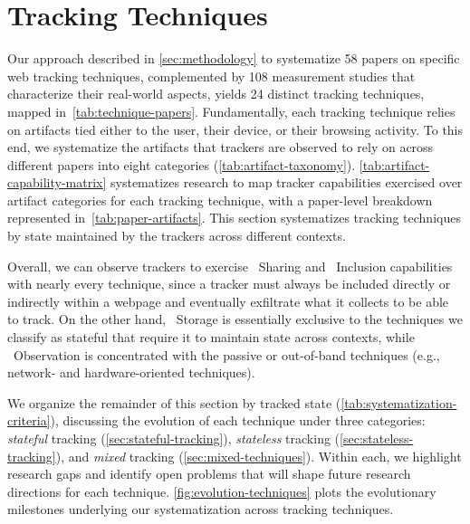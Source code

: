 \section{Tracking Techniques}
\label{sec:tracking-techniques}



Our approach described in \autoref{sec:methodology} to systematize 58 papers on specific web tracking techniques, complemented by 108 measurement studies that characterize their real-world aspects, yields 24 distinct tracking techniques, mapped in~\autoref{tab:technique-papers}.
%
Fundamentally, each tracking technique relies on artifacts tied either to the user, their device, or their browsing activity.
%
To this end, we systematize the artifacts that trackers are observed to rely on across different papers into eight categories (\autoref{tab:artifact-taxonomy}).
%
\autoref{tab:artifact-capability-matrix} systematizes research to map tracker capabilities exercised over artifact categories for each tracking technique, with a paper-level breakdown represented in~\autoref{tab:paper-artifacts}. 
%
This section systematizes tracking techniques by state maintained by the trackers across different contexts.

Overall, we can observe trackers to exercise \symSharing~Sharing and \symInclusion~Inclusion capabilities with nearly every technique, since a tracker must always be included directly or indirectly within a webpage and eventually exfiltrate what it collects to be able to track. 
%
On the other hand, \symStorage~Storage is essentially exclusive to the techniques we classify as stateful that require it to maintain state across contexts, while \symObservation~Observation is concentrated with the passive or out-of-band techniques (e.g., network- and hardware-oriented techniques).





We organize the remainder of this section by tracked state (\autoref{tab:systematization-criteria}), discussing the evolution of each technique under three categories: \textit{stateful} tracking (\autoref{sec:stateful-tracking}), \textit{stateless} tracking (\autoref{sec:stateless-tracking}), and \textit{mixed} tracking (\autoref{sec:mixed-techniques}).
%
Within each, we highlight research gaps and identify open problems that will shape future research directions for each technique.
%
\autoref{fig:evolution-techniques} plots the evolutionary milestones underlying our systematization across tracking techniques.


